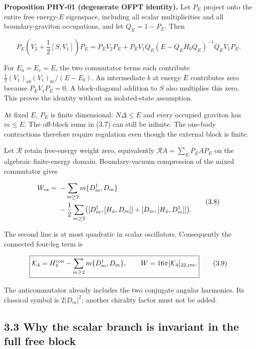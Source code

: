 \textbf{Proposition PHY-01 (degenerate OFPT identity).} Let \(P_E\) project onto the entire free energy-\(E\) eigenspace, including all scalar multiplicities and all boundary-graviton occupations, and let \(Q_E=1-P_E\). Then

\[
\boxed{
P_E\left(V_2+\frac12[S,V_1]\right)P_E
=P_EV_2P_E+
P_EV_1Q_E(E-Q_EH_0Q_E)^{-1}Q_EV_1P_E .
}
\tag{3.7}
\]

For \(E_a=E_c=E\), the two commutator terms each contribute \(\frac12(V_1)_{ab}(V_1)_{bc}/(E-E_b)\). An intermediate \(b\) at energy \(E\) contributes zero because \(P_EV_1P_E=0\). A block-diagonal addition to \(S\) also multiplies this zero. This proves the identity without an isolated-state assumption.

At fixed \(E\), \(P_E\) is finite dimensional: \(N\Delta\le E\) and every occupied graviton has \(m\le E\). The off-block sums in (3.7) can still be infinite. The one-body contractions therefore require regulation even though the external block is finite.

Let \(\mathcal R\) retain free-energy weight zero, equivalently \(\mathcal RA=\sum_EP_EAP_E\) on the algebraic finite-energy domain. Boundary-vacuum compression of the mixed commutator gives

\[
\begin{aligned}
W_{\rm ex}={}&-\sum_{m\ge2}m\{D_m^\dagger,D_m\}\\
&-\frac12\sum_{m\ge2}
\bigl([D_m^\dagger,[H_\phi,D_m]]
+[D_m,[H_\phi,D_m^\dagger]]\bigr).
\end{aligned}
\tag{3.8}
\]

The second line is at most quadratic in scalar oscillators. Consequently the connected four-leg term is

\[
\boxed{
\mathcal K_4=H_4^{\rm con}-\sum_{m\ge2}m\{D_m^\dagger,D_m\},
\qquad
W=16\pi[\mathcal K_4]_{22,\rm res}.
}
\tag{3.9}
\]

The anticommutator already includes the two conjugate angular harmonics. Its classical symbol is \(2|D_m|^2\); another chirality factor must not be added.

\hypertarget{why-the-scalar-branch-is-invariant-in-the-full-free-block}{%
\subsection{3.3 Why the scalar branch is invariant in the full free block}\label{why-the-scalar-branch-is-invariant-in-the-full-free-block}}

